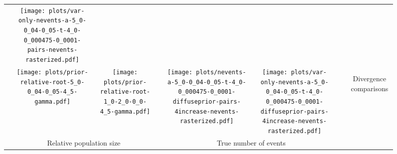 \documentclass[border=10pt,varwidth=30cm]{standalone}
\begin{document}
\begin{figure}
\begin{tabular}{@{}cccccccc@{}}
        & \texttt{[image: plots/var-only-nevents-a-5\_0-0\_04-0\_05-t-4\_0-0\_000475-0\_0001-pairs-nevents-rasterized.pdf]}
        & \multicolumn{1}{c|}{}
        & \\
        & \texttt{[image: plots/prior-relative-root-5\_0-0\_04-0\_05-4\_5-gamma.pdf]}
        & \texttt{[image: plots/prior-relative-root-1\_0-2\_0-0\_0-4\_5-gamma.pdf]}
        &
        & \texttt{[image: plots/nevents-a-5\_0-0\_04-0\_05-t-4\_0-0\_000475-0\_0001-diffuseprior-pairs-4increase-nevents-rasterized.pdf]}
        & \texttt{[image: plots/var-only-nevents-a-5\_0-0\_04-0\_05-t-4\_0-0\_000475-0\_0001-diffuseprior-pairs-4increase-nevents-rasterized.pdf]}
        & \multicolumn{1}{c|}{}
        & \multirow{5}{*}[16.5em]{\begin{sideways}\Large Divergence comparisons\end{sideways}} \\
        & \multicolumn{2}{c}{\large Relative population size}
        &
        & \multicolumn{2}{c}{\large True number of events}
        &
        & \\
    \end{tabular}
\end{figure}
\end{document}
